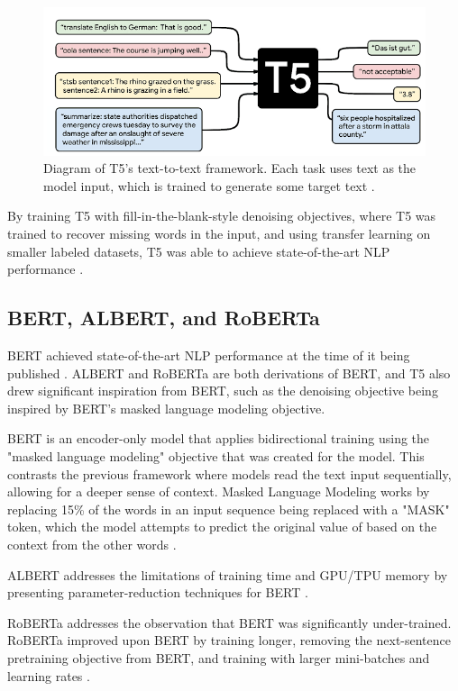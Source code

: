 \begin{figure}
    \begin{center}
	   \includegraphics[width=0.75\linewidth]{figures/t5example.png}
    \end{center}
    \caption{Diagram of T5's text-to-text framework. Each task uses text as the model input, which is trained to generate some target text \cite{Raffel:2020}.}
    \label{fig:t5example}
\end{figure}

By training \gls{T5} with fill-in-the-blank-style \gls{denoising} objectives, where T5 was trained to recover missing words in the input, and using transfer learning on smaller labeled datasets, T5 was able to achieve state-of-the-art \gls{NLP} performance \cite{Raffel:2020}.

\subsection{BERT, ALBERT, and RoBERTa}
\gls{BERT} achieved state-of-the-art \gls{NLP} performance at the time of it being published \cite{Devlin:2018}. ALBERT and RoBERTa are both derivations of BERT, and \gls{T5} also drew significant inspiration from BERT, such as the \gls{denoising} objective being inspired by BERT's masked language modeling objective.

\gls{BERT} is an encoder-only model that applies bidirectional training using the "masked language modeling" objective that was created for the model. This contrasts the previous framework where models read the text input sequentially, allowing for a deeper sense of context. Masked Language Modeling works by replacing 15\% of the words in an input sequence being replaced with a "MASK" token, which the model attempts to predict the original value of based on the context from the other words \cite{Devlin:2018}.

\gls{ALBERT} addresses the limitations of training time and GPU/TPU memory by presenting parameter-reduction techniques for \gls{BERT} \cite{Zhenzhong:2020}.

\gls{RoBERTa} addresses the observation that \gls{BERT} was significantly under-trained. RoBERTa improved upon BERT by training longer, removing the next-sentence pretraining objective from BERT, and training with larger mini-batches and learning rates \cite{Liu:2019}.

